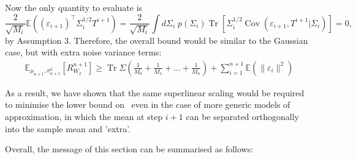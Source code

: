 Now the only quantity to evaluate is 
\begin{equation}
    \frac{2}{\sqrt{M_i}}\mathbb{E}\left((\varepsilon_{i+1})^{\top}\Sigma^{1/2}_iT^{i+1}\right) 
    = \frac{2}{\sqrt{M_i}}\int d\Sigma_i\;p(\Sigma_i)\operatorname{Tr}\left[\Sigma^{1/2}_i\operatorname{Cov}(\varepsilon_{i+1},T^{i+1}|\Sigma_i)\right]=0,
\end{equation}
by Assumption 3. Therefore, the overall bound would be similar to the Gaussian case, but with extra noise variance terms:
\begin{align}
\label{eq:mean_risk_3}
\mathbb{E}_{\mu_{n+1},\sigma_{n+1}^2}\left[R^{n+1}_{W_2}\right]\geq\operatorname{Tr}\Sigma\left(\frac{1}{M_0}+\frac{1}{M_1}+ \dots + \frac{1}{M_{n}}\right)+\sum^{n+1}_{i=1} \mathbb{E}\left(\|\varepsilon_i\|^2\right)
\end{align}

As a result, we have shown that the same superlinear scaling would be required to minimise the lower bound on \md~even in the case of more generic models of approximation, in which the mean at step $i+1$ can be separated orthogonally into the sample mean and 'extra'. 

Overall, the message of this section can be summarised as follows: \\
